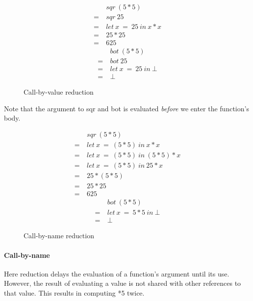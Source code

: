 \begin{figure}[!h]
\centering
\begin{multicols}{2}
\noindent
\begin{align*}
     &sqr\ (5*5) \\
  =\ &sqr\ 25 \\
  =\ &let\ x\ =\ 25\ in\ x * x \\
  =\ &25 * 25 \\
  =\ &625
\end{align*}
\begin{align*}
     &bot\ (5*5) \\
  =\ &bot\ 25 \\
  =\ &let\ x\ =\ 25\ in\ \bot \\
  =\ &\bot
\end{align*}
\end{multicols}
\caption{Call-by-value reduction}
\label{fig:call-by-value}
\end{figure}

Note that the argument to \<sqr\> and \<bot\> is evaluated \emph{before}
we enter the function's body. 

\pagebreak

\begin{figure}[!h]
\centering
\begin{multicols}{2}
\noindent
\begin{align*}
     &sqr\ (5*5) \\
  =\ &let\ x \  =\ (5*5)\ in\ x * x \\
  =\ &let\ x \  =\ (5*5)\ in\ (5*5) * x \\
  =\ &let\ x \  =\ (5*5)\ in\ 25 * x \\
  =\ &25 * (5*5) \\
  =\ &25 * 25 \\
  =\ &625
\end{align*}
\begin{align*}
     &bot\ (5*5) \\
  =\ &let\ x\ =\ 5*5\ in\ \bot \\
  =\ &\bot
\end{align*}
\end{multicols}
\caption{Call-by-name reduction}
\label{fig:call-by-name}
\end{figure}

\paragraph{Call-by-name} Here reduction delays the evaluation of a function's
argument until its use.  However, the result of evaluating a value is not
shared with other references to that value. This results in computing *5\>
twice.

